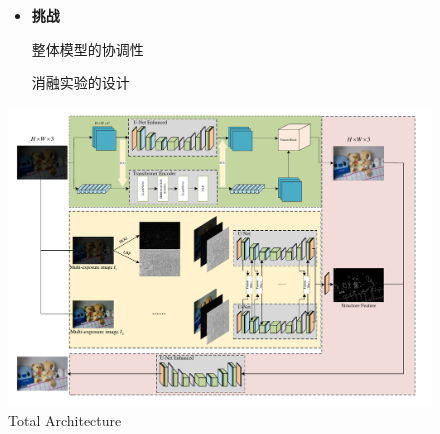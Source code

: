 \documentclass[CJK,aspectratio=169]{beamer}  %
\begin{document}
\begin{frame}
\begin{figure}
\begin{minipage}{.4\columnwidth}
\begin{itemize}
					\item \textbf{挑战}
					
					{ 整体模型的协调性}
					
					{ 消融实验的设计}
				\end{itemize}
			\end{minipage}
			\begin{minipage}{.58\columnwidth}
				\setlength{\abovecaptionskip}{-0.05cm}
				\centering 
				\includegraphics[width=\textwidth]{picture/LLIE/My Architecture/Total architecture}
				\captionsetup{font=scriptsize}
				\caption{
					\label{fig: Total architecture}
					Total Architecture
				}
			\end{minipage}
		\end{figure}
		
	\end{frame}
	
\end{document}
